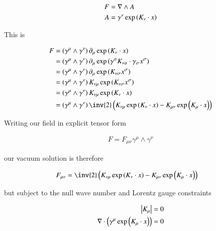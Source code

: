 \begin{align*}
F &= \nabla \wedge A \\
A &= \gamma^\nu \exp\left( K_\nu \cdot x \right)  \\
\end{align*}

This is

\begin{align*}
F 
&= \left(\gamma^\mu \wedge \gamma^\nu\right) \partial_\mu \exp\left( K_\nu \cdot x \right) \\
&= \left(\gamma^\mu \wedge \gamma^\nu\right) \partial_\mu \exp\left( \gamma^\alpha K_{\nu\alpha} \cdot \gamma_\sigma x^\sigma \right) \\
&= \left(\gamma^\mu \wedge \gamma^\nu\right) \partial_\mu \exp\left( K_{\nu\sigma} x^\sigma \right) \\
&= \left(\gamma^\mu \wedge \gamma^\nu\right) K_{\nu\mu} \exp\left( K_{\nu\sigma} x^\sigma \right) \\
&= \left(\gamma^\mu \wedge \gamma^\nu\right) K_{\nu\mu} \exp\left( K_{\nu} \cdot x \right) \\
&= \left(\gamma^\mu \wedge \gamma^\nu\right) 
\inv{2} \left( K_{\nu\mu} \exp\left( K_{\nu} \cdot x \right) - K_{\mu\nu} \exp\left( K_{\mu} \cdot x \right) \right) \\
\end{align*}

Writing our field in explicit tensor form

\begin{align*}
F = F_{\mu\nu} \gamma^\mu \wedge \gamma^\nu
\end{align*}

our vacuum solution is therefore

\begin{align}
F_{\mu\nu} &= \inv{2} \left( K_{\nu\mu} \exp\left( K_{\nu} \cdot x \right) - K_{\mu\nu} \exp\left( K_{\mu} \cdot x \right) \right) 
\end{align}

but subject to the null wave number and Lorentz gauge constraints

\begin{align}
\left\lvert{K_\mu}\right\rvert &= 0 \\
\nabla \cdot \left(\gamma^\mu \exp\left( K_\mu \cdot x \right)\right) &= 0
\end{align}

